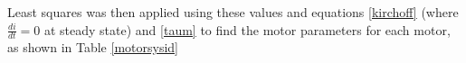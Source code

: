 \documentclass{UoNMCHA}
\numberwithin{equation}{section}
\begin{document}
\begin{figure}[!h]
	\begin{floatrow}
	\end{floatrow}
\end{figure}

Least squares was then applied using these values and equations \ref{kirchoff} (where $\frac{di}{dt}= 0$ at steady state) and \ref{taum} to find the motor parameters for each motor, as shown in Table \ref{motorsysid}
\end{document}
